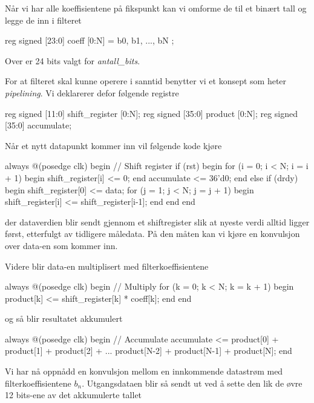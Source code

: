 Når vi har alle koeffisientene på fikspunkt kan vi omforme de til et binært tall og legge de inn i filteret
\begin{verilogcode}
reg signed [23:0] coeff [0:N] = { b0, b1, ..., bN };
\end{verilogcode}
Over er 24 bits valgt for \textit{antall\_bits}.

For at filteret skal kunne operere i sanntid benytter vi et konsept som heter \textit{pipelining}\cite{pipelining}.
Vi deklarerer defor følgende registre 
\begin{verilogcode}
reg signed [11:0] shift_register [0:N];
reg signed [35:0] product [0:N];
reg signed [35:0] accumulate;
\end{verilogcode}

Når et nytt datapunkt kommer inn vil følgende kode kjøre 
\begin{verilogcode}
always @(posedge clk) begin // Shift register
    if (rst) begin
        for (i = 0; i < N; i = i + 1) begin
            shift_register[i] <= 0;
        end
        accumulate <= 36'd0;
    end else if (drdy) begin
        shift_register[0] <= data;
        for (j = 1; j < N; j = j + 1) begin
            shift_register[i] <= shift_register[i-1];
        end
    end
end
\end{verilogcode}
der dataverdien blir sendt gjennom et shiftregister slik at nyeste verdi alltid ligger først, etterfulgt 
av tidligere måledata. På den måten kan vi kjøre en konvulsjon over data-en som kommer inn.

Videre blir data-en multiplisert med filterkoeffisientene 
\begin{verilogcode}
always @(posedge clk) begin // Multiply
    for (k = 0; k < N; k = k + 1) begin
        product[k] <= shift_register[k] * coeff[k];
    end
end
\end{verilogcode}

og så blir resultatet akkumulert 
\begin{verilogcode}
always @(posedge clk) begin // Accumulate
    accumulate <= product[0] + product[1] + product[2] + ...
                  product[N-2]  + product[N-1]  + product[N];
end
\end{verilogcode}
Vi har nå oppnådd en konvulsjon mellom en innkommende datastrøm med filterkoeffisientene $b_n$.
Utgangsdataen blir så sendt ut ved å sette den lik de øvre 12 bits-ene av det akkumulerte tallet

